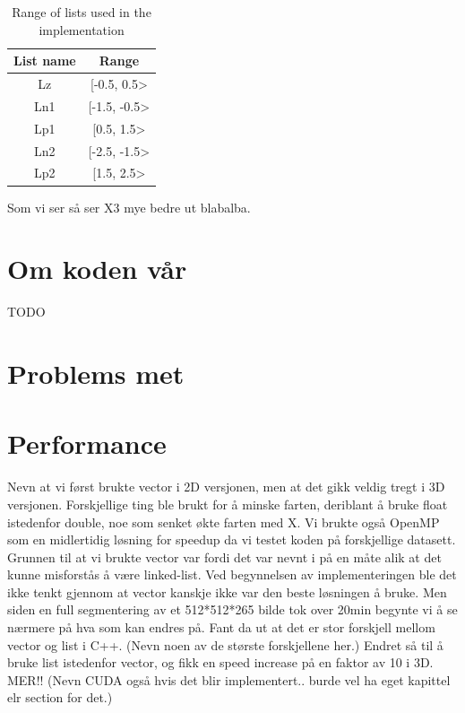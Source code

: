 \begin{table}[h] %
	\begin{tabular}{| c | c |} 
	\hline
	List name & Range\\
	\hline
	Lz & [-0.5, 0.5>\\
	Ln1 & [-1.5, -0.5>\\
	Lp1 & [0.5, 1.5>\\
	Ln2 & [-2.5, -1.5>\\
	Lp2 & [1.5, 2.5>\\
	\hline
	\end{tabular}
	\caption{Range of lists used in the implementation}
	\label{rangeTab2}
\end{table}
Som vi ser så ser X3 mye bedre ut blabalba. 

\section{Om koden vår}
TODO

\section{Problems met}


\section{Performance}
Nevn at vi først brukte vector i 2D versjonen, men at det gikk veldig tregt i 3D versjonen. Forskjellige ting ble brukt for å minske farten, deriblant å bruke float istedenfor double, noe som senket økte farten med X. Vi brukte også OpenMP som en midlertidig løsning for speedup da vi testet koden på forskjellige datasett. Grunnen til at vi brukte vector var fordi det var nevnt i \cite{lankton09} på en måte alik at det kunne misforstås å være linked-list. Ved begynnelsen av implementeringen ble det ikke tenkt gjennom at vector kanskje ikke var den beste løsningen å bruke. Men siden en full segmentering av et 512*512*265 bilde tok over 20min begynte vi å se nærmere på hva som kan endres på. Fant da ut at det er stor forskjell mellom vector og list i C++. (Nevn noen av de største forskjellene her.) Endret så til å bruke list istedenfor vector, og fikk en speed increase på en faktor av 10 i 3D. MER!! (Nevn CUDA også hvis det blir implementert.. burde vel ha eget kapittel elr section for det.) 


